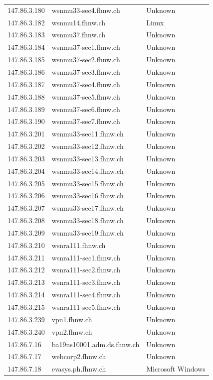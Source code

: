 \documentclass[a4paper,11pt]{scrartcl}
\begin{document}
\begin{longtable}{p{2.5cm}|p{8cm}|l}
	147.86.3.180 & wsnmu33-sec4.fhnw.ch & Unknown\\
	147.86.3.182 & wsnmu14.fhnw.ch & Linux\\
	147.86.3.183 & wsnmu37.fhnw.ch & Unknown\\
	147.86.3.184 & wsnmu37-sec1.fhnw.ch & Unknown\\
	147.86.3.185 & wsnmu37-sec2.fhnw.ch & Unknown\\
	147.86.3.186 & wsnmu37-sec3.fhnw.ch & Unknown\\
	147.86.3.187 & wsnmu37-sec4.fhnw.ch & Unknown\\
	147.86.3.188 & wsnmu37-sec5.fhnw.ch & Unknown\\
	147.86.3.189 & wsnmu37-sec6.fhnw.ch & Unknown\\
	147.86.3.190 & wsnmu37-sec7.fhnw.ch & Unknown\\
	147.86.3.201 & wsnmu33-sec11.fhnw.ch & Unknown\\
	147.86.3.202 & wsnmu33-sec12.fhnw.ch & Unknown\\
	147.86.3.203 & wsnmu33-sec13.fhnw.ch & Unknown\\
	147.86.3.204 & wsnmu33-sec14.fhnw.ch & Unknown\\
	147.86.3.205 & wsnmu33-sec15.fhnw.ch & Unknown\\
	147.86.3.206 & wsnmu33-sec16.fhnw.ch & Unknown\\
	147.86.3.207 & wsnmu33-sec17.fhnw.ch & Unknown\\
	147.86.3.208 & wsnmu33-sec18.fhnw.ch & Unknown\\
	147.86.3.209 & wsnmu33-sec19.fhnw.ch & Unknown\\
	147.86.3.210 & wsnra111.fhnw.ch & Unknown\\
	147.86.3.211 & wsnra111-sec1.fhnw.ch & Unknown\\
	147.86.3.212 & wsnra111-sec2.fhnw.ch & Unknown\\
	147.86.3.213 & wsnra111-sec3.fhnw.ch & Unknown\\
	147.86.3.214 & wsnra111-sec4.fhnw.ch & Unknown\\
	147.86.3.215 & wsnra111-sec5.fhnw.ch & Unknown\\
	147.86.3.239 & vpn1.fhnw.ch & Unknown\\
	147.86.3.240 & vpn2.fhnw.ch & Unknown\\
	147.86.7.16 & ba19ns10001.adm.ds.fhnw.ch & Unknown\\
	147.86.7.17 & webcorp2.fhnw.ch & Unknown\\
	147.86.7.18 & evasys.ph.fhnw.ch & Microsoft Windows\\

\end{longtable}
\end{document}

